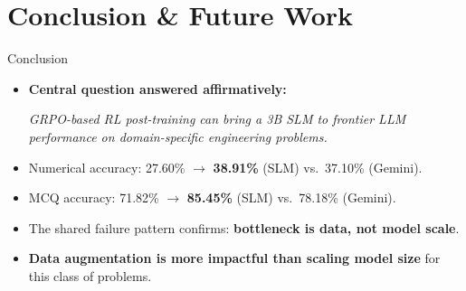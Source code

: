 \documentclass[10pt]{beamer}
\begin{document}
\section{Conclusion \& Future Work}

\begin{frame}{Conclusion}
\large
\begin{itemize}
    \item<1-> \textbf{Central question answered affirmatively:}
    \begin{center}
        \textit{GRPO-based RL post-training can bring a 3B SLM to frontier LLM performance on domain-specific engineering problems.}
    \end{center}

    \vspace{0.2cm}

    \item<1-> Numerical accuracy: 27.60\% $\to$ \textbf{38.91\%} (SLM) vs.\ 37.10\% (Gemini).

    \vspace{0.2cm}

    \item<1-> MCQ accuracy: 71.82\% $\to$ \textbf{85.45\%} (SLM) vs.\ 78.18\% (Gemini).

    \vspace{0.2cm}

    \item<2-> The shared failure pattern confirms: \textbf{bottleneck is data, not model scale}.

    \vspace{0.2cm}

    \item<2-> \textbf{Data augmentation is more impactful than scaling model size} for this class of problems.
\end{itemize}
\end{frame}
\end{document}
